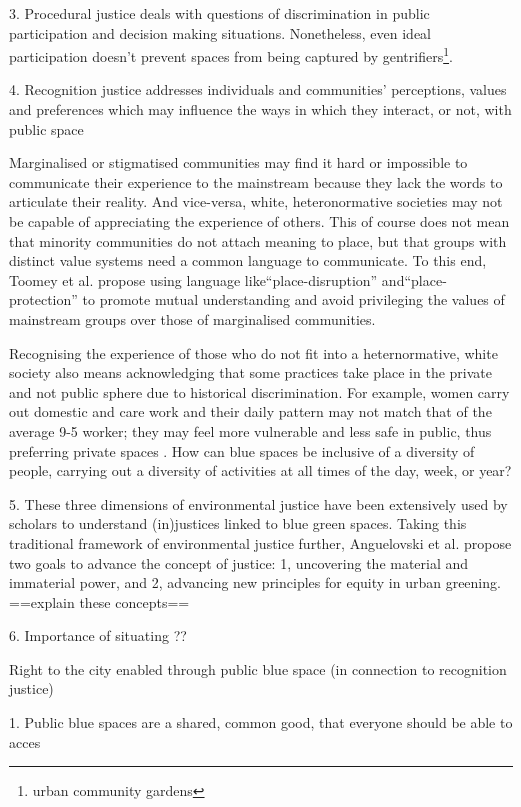 \documentclass{article}
\begin{document}
	3. Procedural justice deals with questions of discrimination in public participation and decision making situations. Nonetheless, even ideal participation doesn't prevent spaces from being captured by gentrifiers\footnote{urban community gardens}.

	4. Recognition justice addresses individuals and communities’ perceptions, values and preferences which may influence the ways in which they interact, or not, with public space \parencite{anguelovski2020expanding}

Marginalised or stigmatised communities may find it hard or impossible to communicate their experience to the mainstream because they lack the words to articulate their reality. And vice-versa, white, heteronormative societies may not be capable of appreciating the experience of others. This of course does not mean that minority communities do not attach meaning to place, but that groups with distinct value systems need a common language to communicate. To this end, Toomey et al. propose using language like``place-disruption'' and``place-protection'' to promote mutual understanding and avoid privileging the values of mainstream groups over those of marginalised communities.

Recognising the experience of those who do not fit into a heternormative, white society also means acknowledging that some practices take place in the private and not public sphere due to historical discrimination. For example, women carry out domestic and care work and their daily pattern may not match that of the average 9-5 worker; they may feel more vulnerable and less safe in public, thus preferring private spaces \parencite{wessells2014urban}. How can blue spaces be inclusive of a diversity of people, carrying out a diversity of activities at all times of the day, week, or year?

	5. These three dimensions of environmental justice have been extensively used by scholars to understand (in)justices linked to blue green spaces. Taking this traditional framework of environmental justice further, Anguelovski et al. propose two goals to advance the concept of justice: 1, uncovering the material and immaterial power, and 2, advancing new principles for equity in urban greening.  ==explain these concepts==
	
	6. Importance of situating ??
	

Right to the city enabled through public blue space (in connection to recognition justice)

	1. Public blue spaces are a shared, common good, that everyone should be able to acces \parencite{wessells2014urban}	
\end{document}
